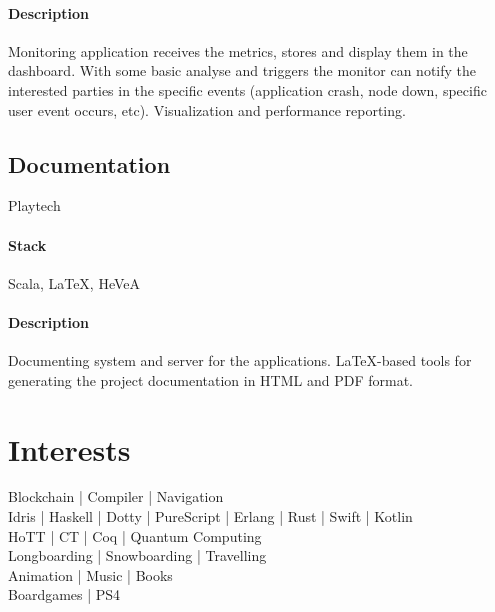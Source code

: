 \paragraph{Description}
Monitoring application receives the metrics, stores and display them in the dashboard. With some basic analyse and triggers the monitor can notify the interested parties in the specific events (application crash, node down, specific user event occurs, etc). Visualization and performance reporting.

\subsection{Documentation}
Playtech
\paragraph{Stack} Scala, LaTeX, HeVeA
\paragraph{Description}
Documenting system and server for the applications. LaTeX-based tools for generating the project documentation in HTML and PDF format.

\section{Interests}
Blockchain | Compiler | Navigation\\
Idris | Haskell | Dotty | PureScript | Erlang | Rust | Swift | Kotlin\\
HoTT | CT | Coq | Quantum Computing\\
Longboarding | Snowboarding | Travelling\\
Animation | Music | Books\\
Boardgames | PS4
